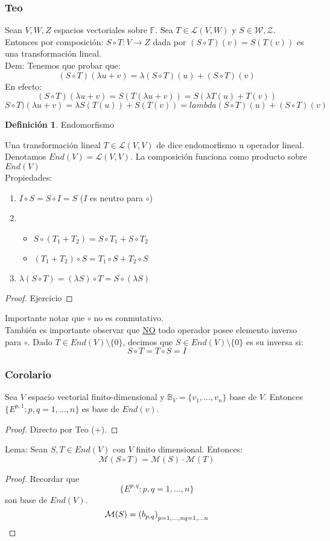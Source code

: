 \documentclass[11pt]{book}
\theoremstyle{definition}
\newtheorem{defn}{Definición}[section]
\begin{document}
\subsubsection{Teo}
Sean $V,W,Z$ espacios vectoriales sobre $\mathbb{F}$. Sea $T\in\mathcal{L}(V,W)$ y $S\in\mathcal{W,Z}$. Entonces por composición: $S\circ T:V\rightarrow Z$ dada por $(S\circ T)(v)=S(T(v))$ es una transformación lineal.\\
Dem: Tenemos que probar que:
\[
(S\circ T)(\lambda u+v)=\lambda(S\circ T)(u)+(S\circ T)(v)
\]
En efecto:
\[
(S\circ T)(\lambda u+v)=S(T(\lambda u+v))=S(\lambda T(u)+T(v))
\]
\[
S\circ T)(\lambda u+v)=\lambda S(T(u))+S(T(v))=lambda(S\circ T)(u)+(S\circ T)(v)
\]
\begin{defn}{Endomorfismo}

Una transformación lineal $T\in\mathcal{L}(V,V)$ de dice endomorfismo u operador lineal. Denotamos $End (V)=\mathcal{L}(V,V)$. La composición funciona como producto sobre $End(V)$\\
Propiedades:
\begin{enumerate}[label=\alph*)]
	\item $I\circ S=S\circ I=S$ ($I$ es neutro para $\circ$)
	
	\item \begin{itemize} \item $S\circ (T_1+T_2)=S\circ T_1+S\circ T_2$
					\item $(T_1+T_2)\circ S=T_1\circ S+T_2\circ S$
		\end{itemize}
	
	\item $\lambda(S\circ T)=(\lambda S)\circ T=S\circ(\lambda S)$
\end{enumerate}
\end{defn}
\begin{proof}
Ejercicio
\end{proof}
Importante notar que $\circ$ no es conmutativo.\\
También es importante observar que \underline{NO} todo operador posee elemento inverso para $\circ$. Dado $T\in End(V)\setminus\{0\}$, decimos que $S\in End(V)\setminus\{0\}$ es su inversa si:
\[
S\circ T=T\circ S=I
\]
\subsubsection{Corolario}
Sea $V$ espacio vectorial finito-dimensional y $\mathbb{B}_V=\{v_1,...,v_n\}$ base de $V$. Entonces $\{E^{p,1}:p,q=1,...,n\}$ es base de $End(v)$.
\begin{proof}
Directo por Teo (+).
\end{proof}
Lema: Sean $S,T\in End(V)$ con $V$ finito dimensional. Entonces:
\[
\mathcal{M}(S\circ T)=\mathcal{M}(S)\cdot\mathcal{M}(T)
\]
\begin{proof}
Recordar que
\[\{E^{p,q}:p,q=1,...,n\}\]
son base de $End(V)$.
\[\mathcal{M}(S)=\left(b_{p,q}\right)_{p=1,...,n\\q=1,...n}\]
\end{proof}
\end{document}

